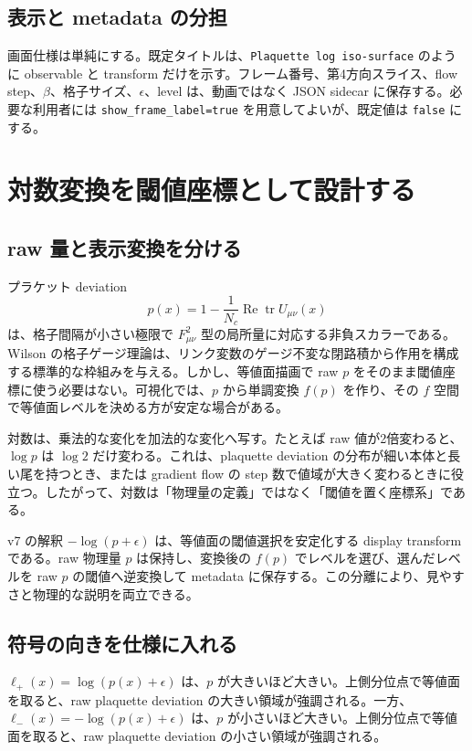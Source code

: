 \documentclass[uplatex,dvipdfmx,ja=standard,11pt,a4paper]{bxjsarticle}
\newcommand{\tr}{\operatorname{tr}}
\newcommand{\Ree}{\operatorname{Re}}
\newcommand{\Nc}{N_c}
\newcommand{\code}[1]{\texttt{#1}}
\begin{document}
\subsection{表示と metadata の分担}
画面仕様は単純にする。既定タイトルは、\code{Plaquette log iso-surface} のように observable と transform だけを示す。フレーム番号、第4方向スライス、flow step、\(\beta\)、格子サイズ、\(\epsilon\)、level は、動画ではなく JSON sidecar に保存する。必要な利用者には \code{show\_frame\_label=true} を用意してよいが、既定値は \code{false} にする。

\section{対数変換を閾値座標として設計する}
\subsection{raw 量と表示変換を分ける}
プラケット deviation
\begin{equation}
  p(x)=1-\frac{1}{\Nc}\Ree\tr U_{\mu\nu}(x)
\end{equation}
は、格子間隔が小さい極限で \(F_{\mu\nu}^2\) 型の局所量に対応する非負スカラーである。Wilson の格子ゲージ理論は、リンク変数のゲージ不変な閉路積から作用を構成する標準的な枠組みを与える\cite{Wilson1974}。しかし、等値面描画で raw \(p\) をそのまま閾値座標に使う必要はない。可視化では、\(p\) から単調変換 \(f(p)\) を作り、その \(f\) 空間で等値面レベルを決める方が安定な場合がある。

対数は、乗法的な変化を加法的な変化へ写す。たとえば raw 値が2倍変わると、\(\log p\) は \(\log 2\) だけ変わる。これは、plaquette deviation の分布が細い本体と長い尾を持つとき、または gradient flow の step 数で値域が大きく変わるときに役立つ。したがって、対数は「物理量の定義」ではなく「閾値を置く座標系」である。

\begin{logbox}{v7 の解釈}
\(-\log(p+\epsilon)\) は、等値面の閾値選択を安定化する display transform である。raw 物理量 \(p\) は保持し、変換後の \(f(p)\) でレベルを選び、選んだレベルを raw \(p\) の閾値へ逆変換して metadata に保存する。この分離により、見やすさと物理的な説明を両立できる。
\end{logbox}

\subsection{符号の向きを仕様に入れる}
\(\ell_+(x)=\log(p(x)+\epsilon)\) は、\(p\) が大きいほど大きい。上側分位点で等値面を取ると、raw plaquette deviation の大きい領域が強調される。一方、\(\ell_-(x)=-\log(p(x)+\epsilon)\) は、\(p\) が小さいほど大きい。上側分位点で等値面を取ると、raw plaquette deviation の小さい領域が強調される。
\end{document}
